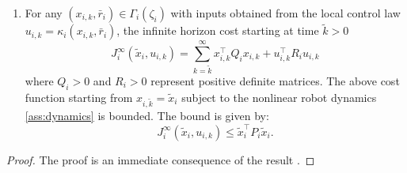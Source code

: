 \begin{lemma}
\begin{enumerate}
\begin{enumerate}
        \item For any $(x_{i,k}, \bar{r}_i) \in \Gamma_i(\zeta_i)$ with inputs obtained from the local control law $u_{i,k}=\kappa_i(x_{i,k}, \bar{r}_i)$, the infinite horizon cost starting at time $\tilde{k}>0$  
        \begin{equation*}
            J_i^\infty(\tilde{x}_{i}, u_{i,k}) = \sum_{k=\tilde{k}}^\infty x_{i,k}^\top Q_i x_{i,k} + u_{i,k}^\top R_i u_{i,k}
        \end{equation*}
        where $Q_i>0$ and $R_i>0$ represent positive definite matrices. The above cost function starting from $x_{i,\tilde{k}}= \tilde{x}_i$ subject to the nonlinear robot dynamics \eqref{ass:dynamics} is bounded. The bound is given by:
        \begin{equation*}
            J_i^\infty(\tilde{x}_{i}, u_{i,k}) \leq \tilde{x}_{i}^\top P_i \tilde{x}_{i}.
        \end{equation*}
    \end{enumerate}
\end{enumerate}
\end{lemma}
\begin{proof}
The proof is an immediate consequence of the result \cite[Lem. 4]{carron2020model}.   
\end{proof}